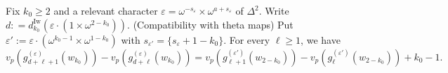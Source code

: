 \begin{lemma}
    \label{L:ghost_compatible_with_theta}
    Fix $k_0 \geq 2$ and a relevant character $\varepsilon= \omega^{-s_\varepsilon} \times \omega^{a+s_\varepsilon}$ of $\Delta^2$. Write $d: = d_{k_0}^{\mathrm{Iw}}(\varepsilon\cdot (1\times \omega^{2-k_0}))$.
    (Compatibility with theta maps)
    Put $\varepsilon' := \varepsilon \cdot (\omega^{k_0-1} \times \omega^{1-k_0})$ with $s_{\varepsilon'} = \{s_\varepsilon +1-k_0\}$. For every $\ell\geq 1$, we have
    \begin{equation*}
    v_p(g^{(\varepsilon)}_{d+\ell+1}(w_{k_0}))-v_p(g^{(\varepsilon)}_{d+\ell}(w_{k_0})) = v_p(g^{(\varepsilon')}_{\ell+1}(w_{2-{k_0}}))-v_p(g^{(\varepsilon')}_{\ell}(w_{2-{k_0}})) +{k_0}-1.
    \end{equation*}
\end{lemma}

